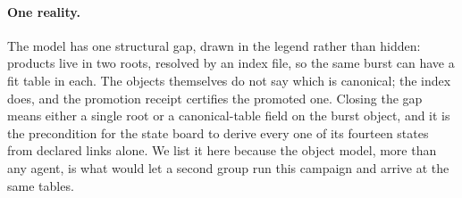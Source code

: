 \paragraph{One reality.} The model has one structural gap, drawn in the
legend rather than hidden: products live in two roots, resolved by an index
file, so the same burst can have a fit table in each. The objects
themselves do not say which is canonical; the index does, and the
promotion receipt certifies the promoted one. Closing the gap means either
a single root or a canonical-table field on the burst object, and it is the
precondition for the state board to derive every one of its fourteen states
from declared links alone. We list it here because the object model, more
than any agent, is what would let a second group run this campaign and
arrive at the same tables.

